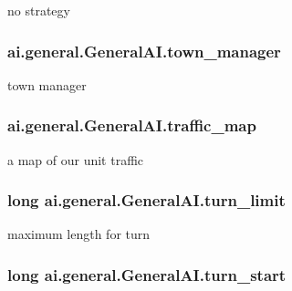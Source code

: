 \label{classai_1_1general_1_1_general_a_i_ad9254d54bbe6ccd739bf82b24fbb4c52}
no strategy \hypertarget{classai_1_1general_1_1_general_a_i_a4430f889ec6dc11ca44711daec0d549b}{
\subsubsection[{town\_\-manager}]{ {\bf ai.general.GeneralAI.town\_\-manager}}}
\label{classai_1_1general_1_1_general_a_i_a4430f889ec6dc11ca44711daec0d549b}
town manager \hypertarget{classai_1_1general_1_1_general_a_i_a8815a09b03f98f9ec68742e32b9c472d}{
\subsubsection[{traffic\_\-map}]{ {\bf ai.general.GeneralAI.traffic\_\-map}}}
\label{classai_1_1general_1_1_general_a_i_a8815a09b03f98f9ec68742e32b9c472d}
a map of our unit traffic \hypertarget{classai_1_1general_1_1_general_a_i_ad35fba6e172dba62ee6a025f90a6b6a4}{
\subsubsection[{turn\_\-limit}]{\setlength{\rightskip}{0pt plus 5cm}long {\bf ai.general.GeneralAI.turn\_\-limit}}}
\label{classai_1_1general_1_1_general_a_i_ad35fba6e172dba62ee6a025f90a6b6a4}
maximum length for turn \hypertarget{classai_1_1general_1_1_general_a_i_ad2b487046bcf8f6266ea279f180b3e74}{
\subsubsection[{turn\_\-start}]{\setlength{\rightskip}{0pt plus 5cm}long {\bf ai.general.GeneralAI.turn\_\-start}}}
